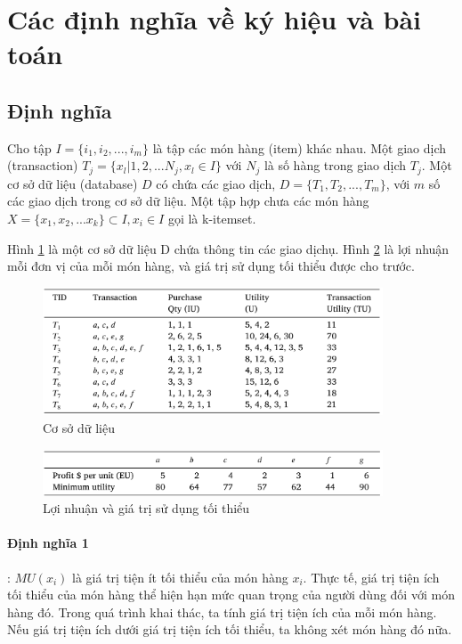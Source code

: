 \section{Các định nghĩa về ký hiệu và bài toán}

\subsection{Định nghĩa}

Cho tập $ I = \{i_1, i_2, ..., i_m\}$ là tập các món hàng (item) khác nhau. Một giao dịch (transaction) $T_j = \{x_l | 1, 2, ...N_j, x_l \in I \} $ với $N_j$ là số hàng trong giao dịch  $T_j$. Một cơ sở dữ liệu (database) $D$ có chứa các giao dịch, $D = \{T_1, T_2, ..., T_m\}$, với $m$ số các giao dịch trong cơ sở dữ liệu. Một tập hợp chưa các món hàng $X =\{ x_1, x_2, ... x_k \} \subset I, x_i \in I $ gọi là k-itemset. 

Hình \ref{fig:table2} là một cơ sở dữ liệu D chứa thông tin các giao dịchụ. Hình \ref{fig:table3} là lợi nhuận mỗi đơn vị của mỗi món hàng, và giá trị sử dụng tối thiểu được cho trước.



\begin{figure}[h]
\centering
\includegraphics[width=0.9\textwidth]{image/table/table2.PNG}
\caption{\label{fig:table2} Cơ sở dữ liệu}
\end{figure}

\begin{figure}[h]
\centering
\includegraphics[width=0.9\textwidth]{image/table/table3.PNG}
\caption{\label{fig:table3} Lợi nhuận và giá trị sử dụng tối thiểu}
\end{figure}

\paragraph{Định nghĩa 1}: $ MU(x_i) $ là giá trị tiện ít tối thiểu của món hàng $x_i$. Thực tế, giá trị tiện ích tối thiểu của món hàng thể hiện hạn mức quan trọng của người dùng đối với món hàng đó. Trong quá trình khai thác, ta tính giá trị tiện ích của mỗi món hàng. Nếu giá trị tiện ích dưới giá trị tiện ích tối thiểu, ta không xét món hàng đó nữa. 

